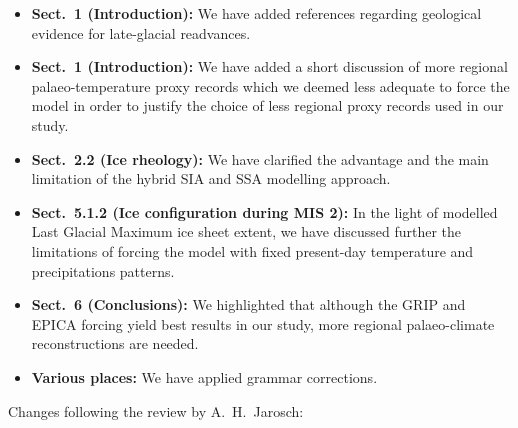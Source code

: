 \begin{itemize}

    \item \textbf{Sect.~1 (Introduction):}
    We have added references regarding geological evidence for late-glacial
    readvances.

    \item \textbf{Sect.~1 (Introduction):}
    We have added a short discussion of more regional palaeo-temperature proxy
    records which we deemed less adequate to force the model in order to
    justify the choice of less regional proxy records used in our study.

    \item \textbf{Sect.~2.2 (Ice rheology):}
    We have clarified the advantage and the main limitation of the hybrid SIA
    and SSA modelling approach.

    \item \textbf{Sect.~5.1.2 (Ice configuration during MIS 2):}
    In the light of modelled Last Glacial Maximum ice sheet extent, we have
    discussed further the limitations of forcing the model with fixed
    present-day temperature and precipitations patterns.

    \item \textbf{Sect.~6 (Conclusions):}
    We highlighted that although the GRIP and EPICA forcing yield best results
    in our study, more regional palaeo-climate reconstructions are needed.

    \item \textbf{Various places:}
    We have applied grammar corrections.

\end{itemize}

Changes following the review by A.~H.~Jarosch:

